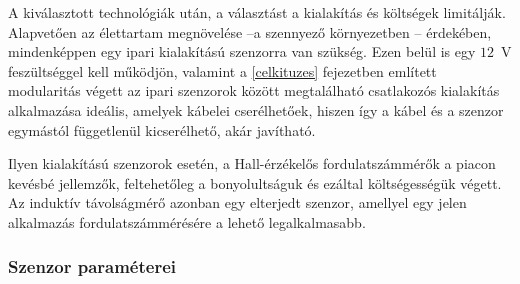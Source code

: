 A kiválasztott technológiák után, a választást a kialakítás és költségek limitálják. Alapvetően az élettartam megnövelése --a szennyező környezetben -- érdekében, mindenképpen egy ipari kialakítású szenzorra van szükség. Ezen belül is egy $12$~V feszültséggel kell működjön, valamint a \ref{celkituzes} fejezetben említett modularitás végett az ipari szenzorok között megtalálható csatlakozós kialakítás alkalmazása ideális, amelyek kábelei cserélhetőek, hiszen így a kábel és a szenzor egymástól függetlenül kicserélhető, akár javítható.

Ilyen kialakítású szenzorok esetén, a Hall-érzékelős fordulatszámmérők a piacon kevésbé jellemzők, feltehetőleg a bonyolultságuk és ezáltal költségességük végett. Az induktív távolságmérő azonban egy elterjedt szenzor, amellyel egy jelen alkalmazás fordulatszámmérésére a lehető legalkalmasabb. 

\subsubsection{Szenzor paraméterei}

